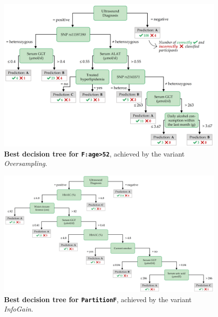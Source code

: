 \documentclass[
  oneside]{book}
\begin{document}
\begin{figure}[htb]

{\centering \includegraphics[width=1\linewidth]{figures/03-tree-menopause} 

}

\caption{\textbf{Best decision tree for \texttt{F:age\textgreater{}52}}, achieved by the variant \emph{Oversampling}.}\label{fig:03-tree-menopause}
\end{figure}



\begin{figure}[htb]

{\centering \includegraphics[width=1\linewidth]{figures/03-tree-women} 

}

\caption{\textbf{Best decision tree for \texttt{PartitionF}}, achieved by the variant \emph{InfoGain}.}\label{fig:03-tree-women}
\end{figure}
\end{document}
